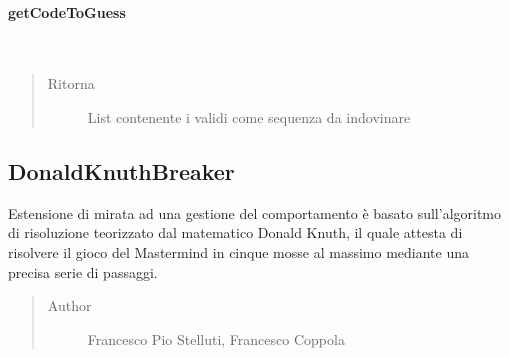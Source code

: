 \documentclass[letterpaper,10pt,italian,openany,oneside]{sphinxmanual}
\begin{document}
\paragraph{getCodeToGuess}
\label{\detokenize{test/it/unicam/cs/pa/mastermind/players/CodeMaker:getcodetoguess}}

\begin{fulllineitems}
\label{\detokenize{test/it/unicam/cs/pa/mastermind/players/CodeMaker:it.unicam.cs.pa.mastermind.players.CodeMaker.getCodeToGuess()}}~\begin{quote}\begin{description}
\item[{Ritorna}] \leavevmode
List contenente i  validi come sequenza da indovinare

\end{description}\end{quote}

\end{fulllineitems}



\subsection{DonaldKnuthBreaker}
\label{\detokenize{test/it/unicam/cs/pa/mastermind/players/DonaldKnuthBreaker:donaldknuthbreaker}}\label{\detokenize{test/it/unicam/cs/pa/mastermind/players/DonaldKnuthBreaker::doc}}

\begin{fulllineitems}
\label{\detokenize{test/it/unicam/cs/pa/mastermind/players/DonaldKnuthBreaker:it.unicam.cs.pa.mastermind.players.DonaldKnuthBreaker}}
Estensione di  mirata ad una gestione del comportamento è basato sull’algoritmo di risoluzione teorizzato dal matematico Donald Knuth, il quale attesta di risolvere il gioco del Mastermind in cinque mosse al massimo mediante una precisa serie di passaggi.
\begin{quote}\begin{description}
\item[{Author}] \leavevmode
Francesco Pio Stelluti, Francesco Coppola

\end{description}\end{quote}

\end{fulllineitems}
\end{document}
